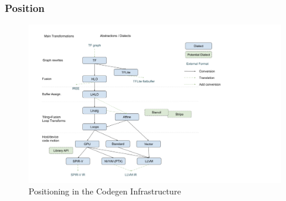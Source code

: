 \documentclass[aspectratio=169]{ctexbeamer}
\begin{document}
\begin{frame}
    \frametitle{Position}

    \begin{figure}
        \centering
        \includegraphics[width=0.56\linewidth]{images/position.png}
        \caption{Positioning in the Codegen Infrastructure}
    \end{figure}

\end{frame}
\end{document}
